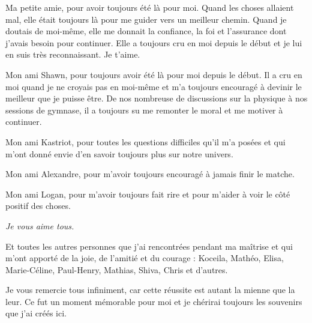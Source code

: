 \begin{onehalfspace}
    \noindent Ma petite amie, pour avoir toujours été là pour moi. Quand les choses allaient mal, elle était toujours là pour me guider vers un meilleur chemin. Quand je doutais de moi-même, elle me donnait la confiance, la foi et l'assurance dont j'avais besoin pour continuer. Elle a toujours cru en moi depuis le début et je lui en suis très reconnaissant. Je t'aime.

    \noindent Mon ami Shawn, pour toujours avoir été là pour moi depuis le début. Il a cru en moi quand je ne croyais pas en moi-même et m'a toujours encouragé à devinir le meilleur que je puisse être. De nos nombreuse de discussions sur la physique à nos sessions de gymnase, il a toujours su me remonter le moral et me motiver à continuer.

    \noindent Mon ami Kastriot, pour toutes les questions difficiles qu'il m'a posées et qui m'ont donné envie d'en savoir toujours plus sur notre univers. 

    \noindent Mon ami Alexandre, pour m'avoir toujours encouragé à jamais finir le matche. 

    \noindent Mon ami Logan, pour m'avoir toujours fait rire et pour m'aider à voir le côté positif des choses.

    \noindent \textit{Je vous aime tous.} 

    \noindent Et toutes les autres personnes que j'ai rencontrées pendant ma maîtrise et qui m'ont apporté de la joie, de l'amitié et du courage : Koceila, Mathéo, Elisa, Marie-Céline, Paul-Henry, Mathias, Shiva, Chris et d'autres.

    \noindent Je vous remercie tous infiniment, car cette réussite est autant la mienne que la leur. Ce fut un moment mémorable pour moi et je chérirai toujours les souvenirs que j'ai créés ici.

\end{onehalfspace}